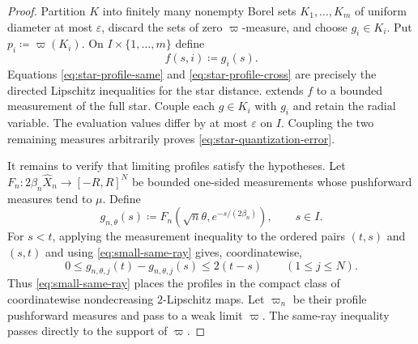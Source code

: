 \documentclass[10pt,a4paper]{amsart}
\numberwithin{equation}{section}
\newcommand{\eps}{\varepsilon}
\begin{document}
\begin{proof}
Partition $K$ into finitely many nonempty Borel sets $K_1,\ldots,K_m$ of uniform diameter at most $\eps$, discard the sets of zero $\varpi$-measure, and choose $g_i\in K_i$.  Put $p_i\coloneqq\varpi(K_i)$.  On $I\times\{1,\ldots,m\}$ define
\[ f(s,i)\coloneqq g_i(s). \]
Equations \eqref{eq:star-profile-same} and \eqref{eq:star-profile-cross} are precisely the directed Lipschitz inequalities for the star distance.   extends $f$ to a bounded measurement of the full star.  Couple each $g\in K_i$ with $g_i$ and retain the radial variable.  The evaluation values differ by at most $\eps$ on $I$.  Coupling the two remaining measures arbitrarily proves \eqref{eq:star-quantization-error}.

It remains to verify that limiting profiles satisfy the hypotheses.  Let $F_n\colon2\beta_n\widehat X_n\to[-R,R]^N$ be bounded one-sided measurements whose pushforward measures tend to $\mu$.  Define
\[ g_{n,\theta}(s) \coloneqq F_n(\sqrt n\theta,e^{-s/(2\beta_n)}), \qquad s\in I. \]
For $s<t$, applying the measurement inequality to the ordered pairs $(t,s)$ and $(s,t)$ and using \eqref{eq:small-same-ray} gives, coordinatewise,
\[ 0\le g_{n,\theta,j}(t)-g_{n,\theta,j}(s)\le2(t-s) \qquad(1\le j\le N). \]
Thus \eqref{eq:small-same-ray} places the profiles in the compact class of coordinatewise nondecreasing $2$-Lipschitz maps.  Let $\varpi_n$ be their profile pushforward measures and pass to a weak limit $\varpi$.  The same-ray inequality passes directly to the support of $\varpi$.


\end{proof}
\end{document}
